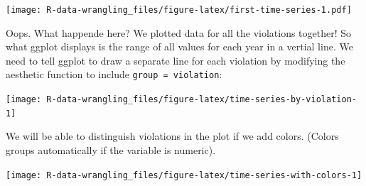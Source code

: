 \documentclass[]{book}
\newenvironment{Shaded}{\begin{snugshade}}{\end{snugshade}}
\newcommand{\DataTypeTok}[1]{\textcolor[rgb]{0.13,0.29,0.53}{#1}}
\newcommand{\KeywordTok}[1]{\textcolor[rgb]{0.13,0.29,0.53}{\textbf{#1}}}
\newcommand{\NormalTok}[1]{#1}
\newcommand{\OperatorTok}[1]{\textcolor[rgb]{0.81,0.36,0.00}{\textbf{#1}}}
\newcommand{\StringTok}[1]{\textcolor[rgb]{0.31,0.60,0.02}{#1}}
\begin{document}
\begin{Shaded}
\end{Shaded}

\texttt{[image: R-data-wrangling\_files/figure-latex/first-time-series-1.pdf]}

Oops. What happende here? We plotted data for all the violations together! So what ggplot displays is the range of all values for each year in a vertial line. We need to tell ggplot to draw a separate line for each violation by modifying the aesthetic function to include \texttt{group\ =\ violation}:

\begin{Shaded}
\end{Shaded}

\texttt{[image: R-data-wrangling\_files/figure-latex/time-series-by-violation-1]}

We will be able to distinguish violations in the plot if we add colors. (Colors groups automatically if the variable is numeric).

\begin{Shaded}
\end{Shaded}

\texttt{[image: R-data-wrangling\_files/figure-latex/time-series-with-colors-1]}
\end{document}
